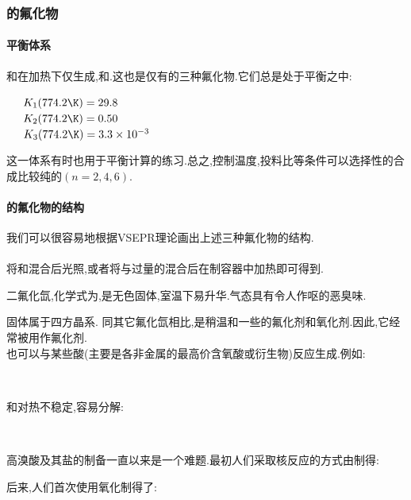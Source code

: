 \documentclass{ctexart}
\begin{document}
\subsubsection{的氟化物}
\paragraph{平衡体系}
和在加热下仅生成,和.这也是仅有的三种氟化物.它们总是处于平衡之中:
\begin{center}
    \ \ \ $K_1(774.2\K)=29.8$\\
    \ \ \ $K_2(774.2\K)=0.50$\\
    \ \ \ $K_3(774.2\K)=3.3\times10^{-3}$
\end{center}
这一体系有时也用于平衡计算的练习.总之,控制温度,投料比等条件可以选择性的合成比较纯的$(n=2,4,6)$.
\paragraph{的氟化物的结构}
我们可以很容易地根据VSEPR理论画出上述三种氟化物的结构.
\paragraph{}
将和混合后光照,或者将与过量的混合后在制容器中加热即可得到.
\begin{substance}[\ce{XeF2}]
    二氟化氙,化学式为,是无色固体,室温下易升华.气态具有令人作呕的恶臭味.
\end{substance}
固体属于四方晶系.
同其它氟化氙相比,是稍温和一些的氟化剂和氧化剂.因此,它经常被用作氟化剂.\\
\indent {}也可以与某些酸(主要是各非金属的最高价含氧酸或衍生物)反应生成.例如:
\begin{center}
    \\
\end{center}
和对热不稳定,容易分解:
\begin{center}
    \\
\end{center}

\indent 高溴酸及其盐的制备一直以来是一个难题.最初人们采取核反应的方式由制得:
\begin{center}
\end{center}
后来,人们首次使用氧化制得了:
\begin{center}
\end{center}
\end{document}
